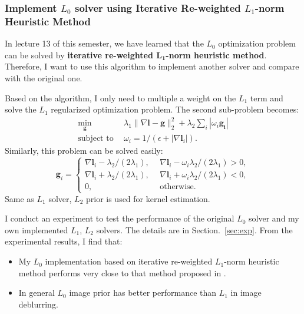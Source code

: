 \documentclass[journal, onecolumn, 10pt]{IEEEtran}
\begin{document}
\subsubsection{Implement $L_0$ solver using Iterative Re-weighted $L_1$-norm Heuristic Method}
In lecture 13 of this semester, we have learned that the $L_0$ optimization problem can be solved by \textbf{iterative re-weighted $\mathbf{L_1}$-norm heuristic method}. Therefore, I want to use this algorithm to implement another solver and compare with the original one.

Based on the algorithm, I only need to multiple a weight on the $L_1$ term and solve the $L_1$ regularized optimization problem. The second sub-problem becomes:
\begin{equation}
\begin{split}
\min_{\mathbf{g}}~~~~~&\lambda_1\|\nabla \mathbf{l} - \mathbf{g}\|_2^2 +  \lambda_2\sum_{i}|\omega_i\mathbf{g_i}|\\
 \text{subject to}~~&\omega_i = 1 / (\epsilon + |\nabla \mathbf{l}_i|).
\end{split}
\label{eqn:our_l1_alter}
\end{equation}
Similarly, this problem can be solved easily:
\begin{equation}
\mathbf{g}_i = 
\begin{cases}
\nabla\mathbf{l}_i - \lambda_2 / (2\lambda_1), &~~ \nabla\mathbf{l}_i - \omega_i\lambda_2 / (2\lambda_1) > 0, \\
\nabla\mathbf{l}_i + \lambda_2 / (2\lambda_1), &~~ \nabla\mathbf{l}_i + \omega_i\lambda_2 / (2\lambda_1) < 0, \\
0, &~~ \text{otherwise}.
\end{cases}
\end{equation}
Same as $L_1$ solver, $L_2$ prior is used for kernel estimation.

I conduct an experiment to test the performance of the original $L_0$ solver and my own implemented $L_1$, $L_2$ solvers. The details are in Section.~\ref{sec:exp}. From the experimental results, I find that:
\begin{itemize}
\item My $L_0$ implementation based on iterative re-weighted $L_1$-norm heuristic method performs very close to that method proposed in \cite{xu2013unnatural}.
\item In general $L_0$ image prior has better performance than $L_1$ in image deblurring.
\end{itemize}
\end{document}
